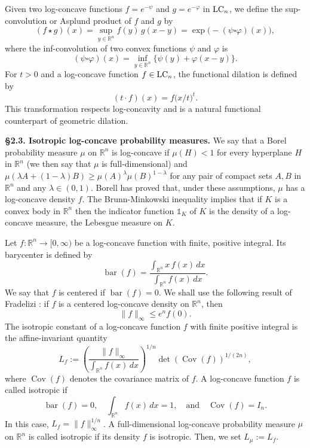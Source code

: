 \documentclass[11pt,leqno]{article}
\theoremstyle{definition}
\theoremstyle{remark}
\numberwithin{equation}{section}
\newcommand{\ls}{\leqslant}
\newcommand{\gr}{\geqslant}
\newcommand{\1}{\textbf{1}}
\begin{document}
Given two log-concave functions $f=e^{-\psi}$ and $g=e^{-\varphi}$ in  ${\rm LC}_{n}$, we define the sup-convolution or 
Asplund product of $f$ and $g$ by
$$(f\star g)(x)= \sup_{y\in\mathbb{R}^n} f(y)\, g(x-y)= \exp\!\big(-(\psi \square \varphi)(x)\big),$$
where the inf-convolution of two convex functions $\psi$ and $\varphi$ is
$$(\psi \square \varphi)(x)=\inf_{y\in\mathbb{R}^n}\big\{\psi(y)+\varphi(x-y)\big\}.$$
For $t>0$ and a log-concave function $f \in {\rm LC}_{n}$, the functional dilation is defined by
$$(t \cdot f)(x) = f\big(x/t\big)^t.$$
This transformation respects log-concavity and is a natural functional counterpart of geometric dilation.

\bigskip 

\noindent \textbf{\S 2.3. Isotropic log-concave probability measures.} We say that a Borel probability measure $\mu$ on $\mathbb R^n$ is log-concave 
if $\mu(H)<1$ for every hyperplane $H$ in ${\mathbb R}^n$ (we then say that $\mu$ is full-dimensional) and $\mu(\lambda A+(1-\lambda)B) \gr \mu(A)^{\lambda}\mu(B)^{1-\lambda}$ for any pair of compact sets $A,B$ in ${\mathbb R}^n$ and any $\lambda \in (0,1)$. Borell \cite{Borell-1974} has proved that, under these assumptions, $\mu $ has a log-concave density $f$. The Brunn-Minkowski inequality implies that if $K$ is a convex body in $\mathbb R^n$ then the indicator function $\mathds{1}_{K} $ of $K$ is the density of a log-concave measure, the Lebesgue measure on $K$.

Let $f:\mathbb{R}^n\to [0,\infty)$ be a log-concave function with finite, positive integral. Its barycenter is defined by
$$\operatorname{bar}(f)= \frac{\int_{\mathbb{R}^n} x\, f(x)\, dx}{\int_{\mathbb{R}^n} f(x)\, dx}.$$
We say that $f$ is centered if $\operatorname{bar}(f)=0$.
We shall use the following result of Fradelizi \cite{Fradelizi-1997}: if $f$ is a centered log-concave density on ${\mathbb R}^n$, then
\begin{equation}\label{eq:frad-2}\|f\|_{\infty }\ls e^nf(0).\end{equation}
The isotropic constant of a log-concave function $f$ with finite positive integral is the affine-invariant quantity
\begin{equation}\label{eq:definition-isotropic}
L_f:= \left( \frac{\|f\|_{\infty}}{\int_{\mathbb{R}^n} f(x)\, dx} \right)^{1/n} \det(\operatorname{Cov}(f))^{1/(2n)},
\end{equation}
where $\operatorname{Cov}(f)$ denotes the covariance matrix of $f$. A log-concave function $f$ is called isotropic if
$$\operatorname{bar}(f)=0,\quad \int_{\mathbb{R}^n}f(x)\,dx=1,\quad \text{and} \quad \operatorname{Cov}(f)=I_n.$$
In this case, $L_f=\|f\|_{\infty}^{1/n}$. A full-dimensional log-concave probability measure $\mu$ on $\mathbb{R}^n$ is called isotropic if its
density $f$ is isotropic. Then, we set $L_{\mu}:=L_f$.
\end{document}
